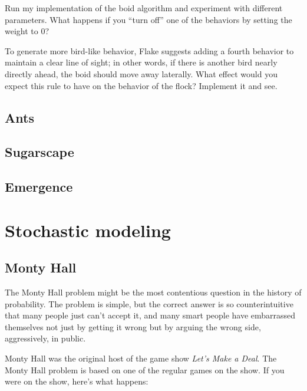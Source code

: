 \documentclass[10pt]{book}
\begin{document}
\begin{ex}

Run my implementation of the boid algorithm and experiment with
different parameters.  What happens if you ``turn off'' one
of the behaviors by setting the weight to 0?

To generate more bird-like behavior, 
Flake suggests adding a fourth behavior to maintain a clear
line of sight; in other words, if there is another bird nearly
directly ahead, the boid should move away laterally.  What effect
would you expect this rule to have on the behavior of the flock?
Implement it and see.

\end{ex}


\section{Ants}

\section{Sugarscape}

\section{Emergence}



\chapter{Stochastic modeling}

\section{Monty Hall}

The Monty Hall problem might be the most contentious question in
the history of probability.  The problem is simple, but the correct
answer is so counterintuitive that many people just can't accept
it, and many smart people have embarrassed themselves not just by
getting it wrong but by arguing the wrong side, aggressively,
in public.

Monty Hall was the original host of the game show {\em Let's Make a
Deal}.  The Monty Hall problem is based on one of the regular
games on the show.  If you were on the show, here's what
happens:
\end{document}
